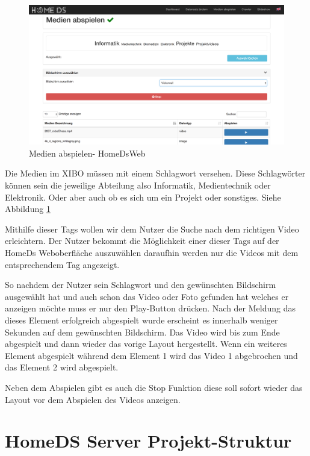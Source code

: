 \begin{figure}[h]
\centering
\includegraphics[width=1\textwidth]{images/08_HomeDsWeb/PlayMediaOverview.png}
\caption{Medien abspielen- HomeDsWeb}
\label{img:playmedia}
\end{figure}

Die Medien im XIBO müssen mit einem Schlagwort versehen. Diese Schlagwörter können sein die jeweilige Abteilung also Informatik, Medientechnik oder Elektronik. Oder aber auch ob es sich um ein Projekt oder sonstiges. Siehe Abbildung \ref{img:playmedia}

Mithilfe dieser Tags wollen wir dem Nutzer die Suche nach dem richtigen Video erleichtern. Der Nutzer bekommt die Möglichkeit einer dieser Tags auf der HomeDs Weboberfläche auszuwählen daraufhin werden nur die Videos mit dem entsprechendem Tag angezeigt.

So nachdem der Nutzer sein Schlagwort und den gewünschten Bildschirm ausgewählt hat und auch schon das Video oder Foto gefunden hat welches er anzeigen möchte muss er nur den Play-Button drücken. Nach der Meldung das dieses Element erfolgreich abgespielt wurde erscheint es innerhalb weniger Sekunden auf dem gewünschten Bildschirm. Das Video wird bis zum Ende abgespielt und dann wieder das vorige Layout hergestellt. Wenn ein weiteres Element abgespielt während dem Element 1 wird das Video 1 abgebrochen und das Element 2 wird abgespielt.

Neben dem Abspielen gibt es auch die Stop Funktion diese soll sofort wieder das Layout vor dem Abspielen des Videos anzeigen.


\section{HomeDS Server Projekt-Struktur}\label{sec:javaeestruktur}


